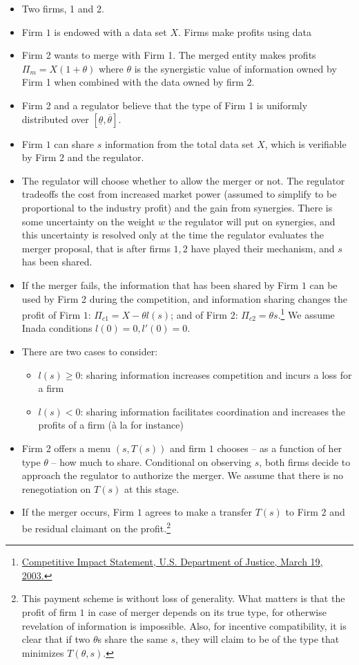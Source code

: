 \documentclass[a4paper]{article}
\renewcommand{\t}{\theta}
\begin{document}
\begin{itemize}
	\item Two firms, 1 and 2. 
	\item Firm $1$ is endowed with a data set $X$. Firms make profits using data
	\item Firm 2 wants to merge with Firm 1. The merged entity makes profits $\Pi_m=X(1+\t)$ where $\t$ is the synergistic value of information owned by Firm 1 when combined with the data owned by firm $2$. 
	\item Firm 2 and a regulator believe that the type of Firm 1 is uniformly distributed over $[\underline{\t},\overline{\t}]$.
    \item Firm $1$ can share $s$ information from the total data set $X$, which is verifiable by Firm $2$ and the regulator.
	\item The regulator will choose whether to allow the merger or not. The regulator tradeoffs the cost from increased market power (assumed to simplify to be proportional to the industry profit) and the gain from synergies. There is some uncertainty on the weight $w$ the regulator will put on synergies, and this uncertainty is resolved only at the time the regulator evaluates the merger proposal, that is after firms $1,2$ have played their mechanism, and $s$ has been shared.
	\item If the merger fails, the information that has been shared by Firm $1$ can be used by Firm 2 during the competition, and information sharing changes the profit of Firm $1$: $\Pi_{c1}=X-\t l(s)$; and of Firm 2: $\Pi_{c2}=\t s$.\footnote{\href{
https://www.justice.gov/atr/case-document/competitive-impact-statement-108}{Competitive Impact Statement, U.S. Department of Justice, March 19, 2003.}} We assume Inada conditions $l(0)=0,l'(0)=0$.
	\item There are two cases to consider:
\begin{itemize}
    \item $l(s)\geq 0$: sharing information increases competition and incurs a loss for a firm
    \item $l(s)< 0$: sharing information facilitates coordination and increases the profits of a firm (à la \cite{vives1984duopoly} for instance)
 \end{itemize}
    \item Firm 2 offers a menu $(s,T(s))$ and firm $1$ chooses -- as a function of her type $\theta$ -- how much to share. Conditional on observing $s$, both firms decide to approach the regulator to authorize the merger. We assume that there is no renegotiation on $T(s)$ at this stage.
    \item If the merger occurs, Firm $1$ agrees to make a transfer  $T(s)$ to Firm 2 and be residual claimant on the profit.\footnote{%
    This payment scheme is without loss of generality. What matters is that the profit of firm $1$ in case of merger depends on its true type, for otherwise revelation of information is impossible. Also, for incentive compatibility, it is clear that if two $\theta$s share the same $s$, they will claim to be of the type that minimizes $T(\theta,s)$.}
    
\end{itemize}
\end{document}
